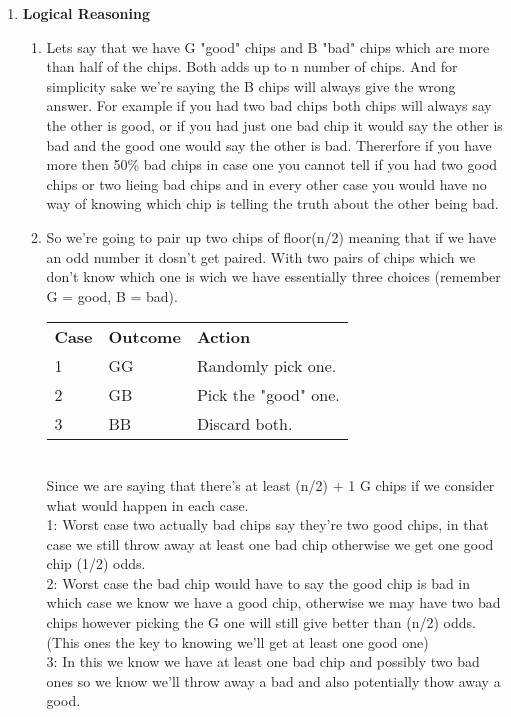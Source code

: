 \documentclass{article}
\begin{document}
\begin{enumerate}
        \item \textbf{Logical Reasoning} 
        \begin{enumerate}
          \item Lets say that we have G "good" chips and B "bad" chips which are more than half of the chips. Both adds up to n number of chips. 
          And for simplicity sake we're saying the B chips will always give the wrong answer. 
          For example if you had two bad chips both chips will always say the other is good, or if you had just one bad chip it would say the other is bad and the good one would say the other is bad.
          Thererfore if you have more then 50\% bad chips in case one you cannot tell if you had two good chips or two lieing bad chips and in every other case you would have no way of knowing which chip is telling the truth about the other being bad.

          \item So we're going to pair up two chips of floor(n/2) meaning that if we have an odd number it dosn't get paired. 
          With two pairs of chips which we don't know which one is wich we have essentially three choices (remember G = good, B = bad).\\
          
          \begin{tabular}{lll}
            \textbf{Case} & \textbf{Outcome} & \textbf{Action} \\
            1 & GG & Randomly pick one. \\
            2 & GB & Pick the "good" one. \\
            3 & BB & Discard both. \\
            \end{tabular} \\

          Since we are saying that there's at least (n/2) + 1 G chips if we consider what would happen in each case.\\
          1: Worst case two actually bad chips say they're two good chips, in that case we still throw away at least one bad chip otherwise we get one good chip (1/2) odds. \\
          2: Worst case the bad chip would have to say the good chip is bad in which case we know we have a good chip, otherwise we may have two bad chips however picking the G one will still give better than (n/2) odds. (This ones the key to knowing we'll get at least one good one) \\
          3: In this we know we have at least one bad chip and possibly two bad ones so we know we'll throw away a bad and also potentially thow away a good. \\


\end{enumerate}
\end{enumerate}
\end{document}
